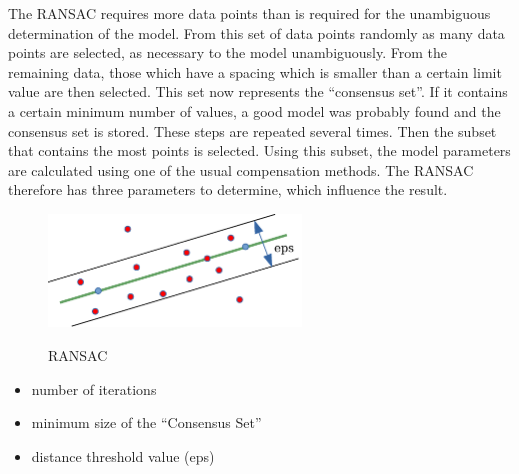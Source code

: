 
The \ac{RANSAC} requires more data points than is required for the unambiguous determination of the model. 
From this set of data points randomly as many data points are selected, as necessary to the model unambiguously. 
From the remaining data, those which have a spacing which is smaller than a certain limit value are then selected.
This set now represents the ``consensus set''. If it contains a certain minimum number of values, a good model was probably found and the consensus set is stored.
These steps are repeated several times. Then the subset that contains the most points is selected. Using this subset, 
the model parameters are calculated using one of the usual compensation methods. The \ac{RANSAC} therefore has three parameters to determine, which influence the result.


\begin{figure}[!ht]
\begin{center}
\caption{\acs{RANSAC} \cite{Fischler1981}}
\includegraphics[width=0.6\textwidth]{bilder/ransac.pdf}
\label{ransac}
\end{center}
\end{figure}


\begin{itemize}
 \item number of iterations
 \item minimum size of the ``Consensus Set''
 \item distance threshold value (eps)
\end{itemize}

